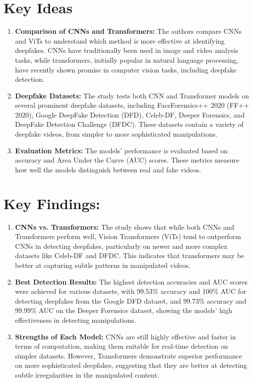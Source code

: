 \documentclass{report}
\begin{document}
	\section{Key Ideas}
	\begin{enumerate}
		\item 
		\textbf{Comparison of CNNs and Transformers:} The authors compare CNNs and ViTs to understand which method is more effective at identifying deepfakes. CNNs have traditionally been used in image and video analysis tasks, while transformers, initially popular in natural language processing, have recently shown promise in computer vision tasks, including deepfake detection.
		
		\item 
		\textbf{Deepfake Datasets:} The study tests both CNN and Transformer models on several prominent deepfake datasets, including FaceForensics++ 2020 (FF++ 2020), Google DeepFake Detection (DFD), Celeb-DF, Deeper Forensics, and DeepFake Detection Challenge (DFDC). These datasets contain a variety of deepfake videos, from simpler to more sophisticated manipulations.
		
		\item 
		\textbf{Evaluation Metrics:} The models' performance is evaluated based on accuracy and Area Under the Curve (AUC) scores. These metrics measure how well the models distinguish between real and fake videos.
	\end{enumerate}
	
	\section{Key Findings:}
	\begin{enumerate}
		\item 
		\textbf{CNNs vs. Transformers:} The study shows that while both CNNs and Transformers perform well, Vision Transformers (ViTs) tend to outperform CNNs in detecting deepfakes, particularly on newer and more complex datasets like Celeb-DF and DFDC. This indicates that transformers may be better at capturing subtle patterns in manipulated videos.
		
		\item 
		\textbf{Best Detection Results:} The highest detection accuracies and AUC scores were achieved for various datasets, with 99.53\% accuracy and 100\% AUC for detecting deepfakes from the Google DFD dataset, and 99.73\% accuracy and 99.99\% AUC on the Deeper Forensics dataset, showing the models' high effectiveness in detecting manipulations.
		
		\item 
		\textbf{Strengths of Each Model:} CNNs are still highly effective and faster in terms of computation, making them suitable for real-time detection on simpler datasets. However, Transformers demonstrate superior performance on more sophisticated deepfakes, suggesting that they are better at detecting subtle irregularities in the manipulated content.
	\end{enumerate}
	
\end{document}
